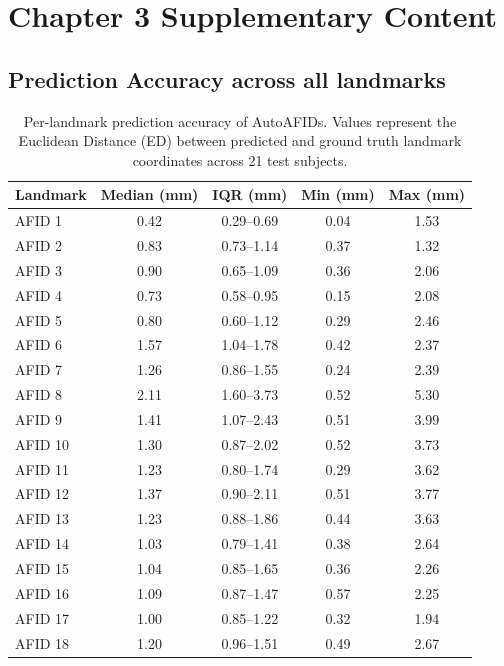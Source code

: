 \chapter{Chapter 3 Supplementary Content}\label{app:ch3suppcontent}
\newpage

\section{Prediction Accuracy across all landmarks}\label{app:Chap}

\begin{table}[H]
\centering
\small
\caption{Per-landmark prediction accuracy of AutoAFIDs. Values represent the Euclidean Distance (ED) between predicted and ground truth landmark coordinates across 21 test subjects.}
\label{tab:autoafids_accuracy}
\begin{tabular}{lcccc}
\toprule
\textbf{Landmark} & \textbf{Median (mm)} & \textbf{IQR (mm)} & \textbf{Min (mm)} & \textbf{Max (mm)} \\
\midrule
AFID 1  & 0.42 & 0.29--0.69 & 0.04 & 1.53 \\
AFID 2  & 0.83 & 0.73--1.14 & 0.37 & 1.32 \\
AFID 3  & 0.90 & 0.65--1.09 & 0.36 & 2.06 \\
AFID 4  & 0.73 & 0.58--0.95 & 0.15 & 2.08 \\
AFID 5  & 0.80 & 0.60--1.12 & 0.29 & 2.46 \\
AFID 6  & 1.57 & 1.04--1.78 & 0.42 & 2.37 \\
AFID 7  & 1.26 & 0.86--1.55 & 0.24 & 2.39 \\
AFID 8  & 2.11 & 1.60--3.73 & 0.52 & 5.30 \\
AFID 9  & 1.41 & 1.07--2.43 & 0.51 & 3.99 \\
AFID 10 & 1.30 & 0.87--2.02 & 0.52 & 3.73 \\
AFID 11 & 1.23 & 0.80--1.74 & 0.29 & 3.62 \\
AFID 12 & 1.37 & 0.90--2.11 & 0.51 & 3.77 \\
AFID 13 & 1.23 & 0.88--1.86 & 0.44 & 3.63 \\
AFID 14 & 1.03 & 0.79--1.41 & 0.38 & 2.64 \\
AFID 15 & 1.04 & 0.85--1.65 & 0.36 & 2.26 \\
AFID 16 & 1.09 & 0.87--1.47 & 0.57 & 2.25 \\
AFID 17 & 1.00 & 0.85--1.22 & 0.32 & 1.94 \\
AFID 18 & 1.20 & 0.96--1.51 & 0.49 & 2.67 \\

\end{tabular}
\end{table}
